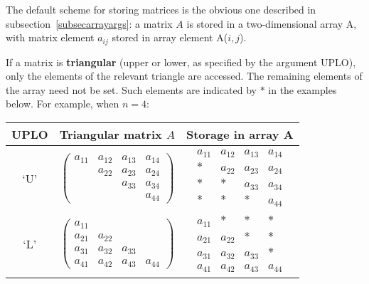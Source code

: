 The default scheme for storing matrices
is the obvious one described in subsection~\ref{subsecarrayargs}:
a matrix $A$ is stored in a two-dimensional array A, with
matrix element $a_{ij}$ stored in array element A($i,j$).

If a matrix is {\bf triangular}
(upper or lower, as specified by
the argument UPLO), only the elements of the relevant triangle
are accessed. The remaining elements of the array need not be set.
Such elements are indicated by $\ast$ in the examples below.
For example, when $n = 4$:

\begin{center}
\begin{tabular}{|c|c|c|} \hline
UPLO & Triangular matrix $A$ & Storage in array A \\ \hline
`U' &
$
\left( \begin{array}{cccc}
a_{11} & a_{12} & a_{13} & a_{14} \\
       & a_{22} & a_{23} & a_{24} \\
       &        & a_{33} & a_{34} \\
       &        &        & a_{44}
\end{array} \right)
$
&
$
\begin{array}{cccc}
a_{11} & a_{12} & a_{13} & a_{14} \\
 \ast  & a_{22} & a_{23} & a_{24} \\
 \ast  &  \ast  & a_{33} & a_{34} \\
 \ast  &  \ast  &  \ast  & a_{44}
\end{array}
$
\\ \hline
`L' &
$
\left( \begin{array}{cccc}
a_{11} &        &        &       \\
a_{21} & a_{22} &        &       \\
a_{31} & a_{32} & a_{33} &       \\
a_{41} & a_{42} & a_{43} & a_{44}
\end{array} \right)
$
&
$
\begin{array}{cccc}
a_{11} &  \ast  &  \ast  &  \ast  \\
a_{21} & a_{22} &  \ast  &  \ast  \\
a_{31} & a_{32} & a_{33} &  \ast  \\
a_{41} & a_{42} & a_{43} & a_{44}
\end{array}
$ 
\\ \hline
\end{tabular}
\end{center}

